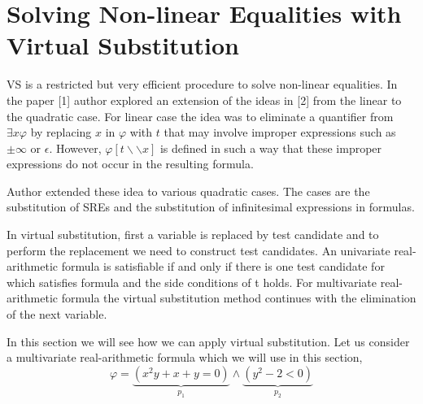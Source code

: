 \section{Solving Non-linear Equalities with Virtual Substitution}
\label{sec:solving non-linear equalities with virtual substitution}
VS is a restricted but very efficient procedure to solve non-linear equalities. In the paper [1] author explored an extension of the ideas in [2] from the linear to the quadratic case. For linear case the idea was to eliminate a quantifier from $\exists x \varphi$ by replacing $x$ in $\varphi$ with $t$ that may involve improper expressions such as $\pm \infty$ or $\epsilon$. However, $\varphi [t\backslash\backslash x]$ is defined in such a way that these improper expressions do not occur in the resulting formula.

Author extended these idea to various quadratic cases. The cases are the substitution of SREs and the substitution of infinitesimal expressions in formulas.

In virtual substitution, first a variable is replaced by test candidate and to perform the replacement we need to construct test candidates. An univariate real-arithmetic formula is satisfiable if and only if there is one test candidate for which satisfies formula and the side conditions of t holds. For multivariate real-arithmetic formula the virtual substitution method continues with the elimination of the next variable.

In this section we will see how we can apply virtual substitution. Let us consider a multivariate real-arithmetic formula which we will use in this section,
$$ \varphi = \underbrace{(x^{2}y + x + y = 0)}\limits_{p_{1}} \wedge \underbrace{(y^{2} -2 < 0)}\limits_{p_{2}}$$
